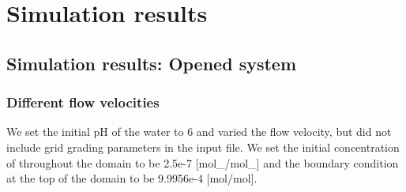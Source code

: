 \section{\DuMuX Simulation results}

\subsection{\DuMuX Simulation results: Opened system}

\subsubsection*{Different flow velocities}\label{ssec:diffFlowVel}
We set the initial pH of the water to 6 and varied the flow velocity, but did not include grid grading parameters in the input file. We set the initial concentration of  throughout the domain to be 2.5e-7 [mol\_/mol\_] and the boundary condition at the top of the domain to be 9.9956e-4 [mol/mol].



